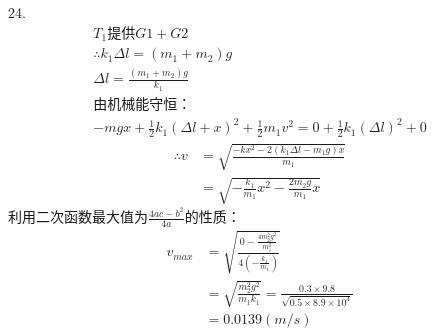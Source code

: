 \documentclass[a4paper,fleqn,twocolumn]{article}
\begin{document}
   		24.
   		\begin{gather*}
	   		T_1\text{提供}G1+G2\\
	   		\therefore k_1\Delta l=(m_1+m_2)g\\
	   		\Delta l=\frac{(m_1+m_2)g}{k_1}\\
	   		\text{由机械能守恒：}\\
	   		-mgx+\frac{1}{2}k_1(\Delta l+x)^2+\frac{1}{2}m_1v^2=0+\frac{1}{2}k_1(\Delta l)^2+0
	   	\end{gather*}
	   	\begin{align*}
	   		\therefore v&=\sqrt{\frac{-kx^2-2(k_1\Delta l-m_1g)x}{m_1}}\\
	   					&=\sqrt{-\frac{k_1}{m_1}x^2-\frac{2m_2g}{m_1}x}
	   	\end{align*}
	   	利用二次函数最大值为$\frac{4ac-b^2}{4a}$的性质：
	   	\begin{align*}
	   		v_{max}	&=\sqrt{\frac{0-\frac{4m_2^2g^2}{m_1^2}}{4\left(-\frac{k_1}{m_1}\right)}}\\
	   				&=\sqrt{\frac{m_2^2g^2}{m_1k_1}}=\frac{0.3\times 9.8}{\sqrt{0.5\times 8.9\times 10^4}}\\
	   				&=0.0139(m/s)
   		\end{align*}
\end{document}
